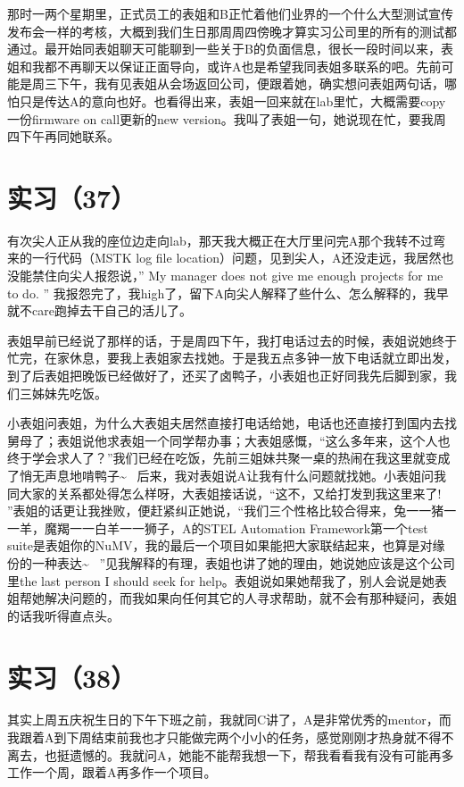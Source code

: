 \documentclass[12pt]{book}
\begin{document}
那时一两个星期里，正式员工的表姐和B正忙着他们业界的一个什么大型测试宣传发布会一样的考核，大概到我们生日那周周四傍晚才算实习公司里的所有的测试都通过。最开始同表姐聊天可能聊到一些关于B的负面信息，很长一段时间以来，表姐和我都不再聊天以保证正面导向，或许A也是希望我同表姐多联系的吧。先前可能是周三下午，我有见表姐从会场返回公司，便跟着她，确实想问表姐两句话，哪怕只是传达A的意向也好。也看得出来，表姐一回来就在lab里忙，大概需要copy一份firmware on call更新的new version。我叫了表姐一句，她说现在忙，要我周四下午再同她联系。


\section{实习（37）}
\label{sec-5-40}

有次尖人正从我的座位边走向lab，那天我大概正在大厅里问完A那个我转不过弯来的一行代码（MSTK log file location）问题，见到尖人，A还没走远，我居然也没能禁住向尖人报怨说，” My manager does not give me enough projects for me to do. ” 我报怨完了，我high了，留下A向尖人解释了些什么、怎么解释的，我早就不care跑掉去干自己的活儿了。

表姐早前已经说了那样的话，于是周四下午，我打电话过去的时候，表姐说她终于忙完，在家休息，要我上表姐家去找她。于是我五点多钟一放下电话就立即出发，到了后表姐把晚饭已经做好了，还买了卤鸭子，小表姐也正好同我先后脚到家，我们三姊妹先吃饭。

小表姐问表姐，为什么大表姐夫居然直接打电话给她，电话也还直接打到国内去找舅母了；表姐说他求表姐一个同学帮办事；大表姐感慨，“这么多年来，这个人也终于学会求人了？”我们已经在吃饭，先前三姐妹共聚一桌的热闹在我这里就变成了悄无声息地啃鸭子\textasciitilde{}~ 后来，我对表姐说A让我有什么问题就找她。小表姐问我同大家的关系都处得怎么样呀，大表姐接话说，“这不，又给打发到我这里来了! ”表姐的话更让我挫败，便赶紧纠正她说，“我们三个性格比较合得来，兔一一猪一一羊，魔羯一一白羊一一狮子，A的STEL Automation Framework第一个test suite是表姐你的NuMV，我的最后一个项目如果能把大家联结起来，也算是对缘份的一种表达\textasciitilde{}~ ”见我解释的有理，表姐也讲了她的理由，她说她应该是这个公司里the last person I should seek for help。表姐说如果她帮我了，别人会说是她表姐帮她解决问题的，而我如果向任何其它的人寻求帮助，就不会有那种疑问，表姐的话我听得直点头。


\section{实习（38）}
\label{sec-5-41}

其实上周五庆祝生日的下午下班之前，我就同C讲了，A是非常优秀的mentor，而我跟着A到下周结束前我也才只能做完两个小小的任务，感觉刚刚才热身就不得不离去，也挺遗憾的。我就问A，她能不能帮我想一下，帮我看看我有没有可能再多工作一个周，跟着A再多作一个项目。
\end{document}
